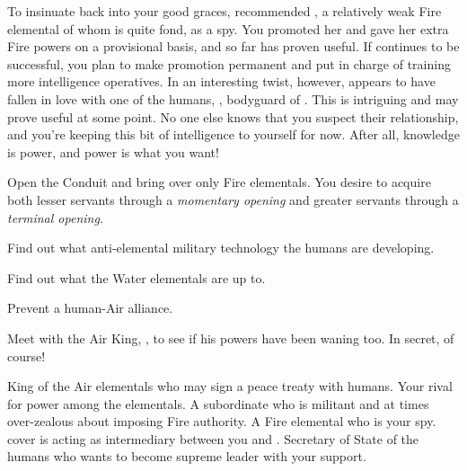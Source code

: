 \documentclass[char]{elementals}
\begin{document}
 To insinuate \cPyro{\themself} back into your good graces, \cPyro{} recommended \cJuliet{\intro}, a relatively weak Fire elemental of whom \cPyro{} is quite fond, as a spy.  You promoted her and gave her extra Fire powers on a provisional basis, and so far \cJuliet{\they} has proven useful.  If \cJuliet{\they} continues to be successful, you plan to make \cJuliet{\their} promotion permanent and put \cJuliet{\their} in charge of training more intelligence operatives.  In an interesting twist, however, \cJuliet{} appears to have fallen in love with one of the humans, \cRomeo{\intro}, bodyguard of \cLeader{}.  This is intriguing and may prove useful at some point.  No one else knows that you suspect their relationship, and you're keeping this bit of intelligence to yourself for now.  After all, knowledge is power, and power is what you want!




\begin{itemz}[Goals]
  \item Open the Conduit and bring over only Fire elementals. You desire to acquire both lesser servants through a \emph{momentary opening} and greater servants through a \emph{terminal opening}.
  \item Find out what anti-elemental military technology the humans are developing.
  \item Find out what the Water elementals are up to.
  \item Prevent a human-Air alliance.
  \item Meet with the Air King, \cKing{\full}, to see if his powers have been waning too.  In secret, of course!
\end{itemz}

\begin{contacts}
  \contact{\cKing{}} King of the Air elementals who may sign a peace treaty with humans.  Your rival for power among the elementals.
  \contact{\cPyro{}} A subordinate who is militant and at times over-zealous about imposing Fire authority.
  \contact{\cJuliet{}} A Fire elemental who is your spy.  \cJuliet{\Their} cover is acting as intermediary between you and \cKing{}.
  \contact{\cDema{}} Secretary of State of the humans who wants to become supreme leader with your support.
\end{contacts}
\end{document}
